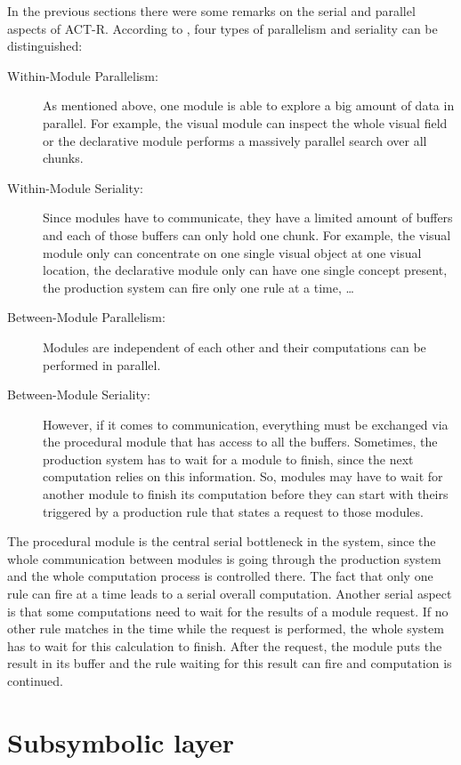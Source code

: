 In the previous sections there were some remarks on the serial and parallel aspects of ACT-R. According to \cite[p. 68]{anderson_how_2007}, four types of parallelism and seriality can be distinguished:

\begin{description}
 \item[Within-Module Parallelism:] As mentioned above, one module is able to explore a big amount of data in parallel. For example, the visual module can inspect the whole visual field or the declarative module performs a massively parallel search over all chunks.
 \item[Within-Module Seriality:] Since modules have to communicate, they have a limited amount of buffers and each of those buffers can only hold one chunk. For example, the visual module only can concentrate on one single visual object at one visual location, the declarative module only can have one single concept present, the production system can fire only one rule at a time, \dots 
 \item[Between-Module Parallelism:] Modules are independent of each other and their computations can be performed in parallel.
 \item[Between-Module Seriality:] However, if it comes to communication, everything must be exchanged via the procedural module that has access to all the buffers. Sometimes, the production system has to wait for a module to finish, since the next computation relies on this information. So, modules may have to wait for another module to finish its computation before they can start with theirs triggered by a production rule that states a request to those modules.
\end{description}

The procedural module is the central serial bottleneck in the system, since the whole communication between modules is going through the production system and the whole computation process is controlled there. The fact that only one rule can fire at a time leads to a serial overall computation. Another serial aspect is that some computations need to wait for the results of a module request. If no other rule matches in the time while the request is performed, the whole system has to wait for this calculation to finish. After the request, the module puts the result in its buffer and the rule waiting for this result can fire and computation is continued.

\section{Subsymbolic layer}
\label{subsymbolic_layer}

